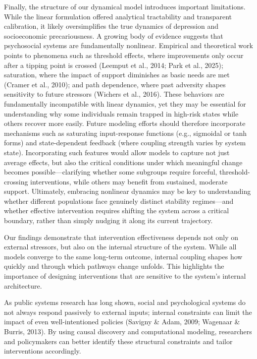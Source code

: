 \documentclass[
]{article}
\begin{document}
Finally, the structure of our dynamical model introduces important
limitations. While the linear formulation offered analytical
tractability and transparent calibration, it likely oversimplifies the
true dynamics of depression and socioeconomic precariousness. A growing
body of evidence suggests that psychosocial systems are fundamentally
nonlinear. Empirical and theoretical work points to phenomena such as
threshold effects, where improvements only occur after a tipping point
is crossed (Leemput et al., 2014; Park et al., 2025); saturation, where
the impact of support diminishes as basic needs are met (Cramer et al.,
2010); and path dependence, where past adversity shapes sensitivity to
future stressors (Wichers et al., 2016). These behaviors are
fundamentally incompatible with linear dynamics, yet they may be
essential for understanding why some individuals remain trapped in
high-risk states while others recover more easily. Future modeling
efforts should therefore incorporate mechanisms such as saturating
input-response functions (e.g., sigmoidal or tanh forms) and
state-dependent feedback (where coupling strength varies by system
state). Incorporating such features would allow models to capture not
just average effects, but also the critical conditions under which
meaningful change becomes possible---clarifying whether some subgroups
require forceful, threshold-crossing interventions, while others may
benefit from sustained, moderate support. Ultimately, embracing
nonlinear dynamics may be key to understanding whether different
populations face genuinely distinct stability regimes---and whether
effective intervention requires shifting the system across a critical
boundary, rather than simply nudging it along its current trajectory.

Our findings demonstrate that intervention effectiveness depends not
only on external stressors, but also on the internal structure of the
system. While all models converge to the same long-term outcome,
internal coupling shapes how quickly and through which pathways change
unfolds. This highlights the importance of designing interventions that
are sensitive to the system's internal architecture.

As public systems research has long shown, social and psychological
systems do not always respond passively to external inputs; internal
constraints can limit the impact of even well-intentioned policies
(Savigny \& Adam, 2009; Wagenaar \& Burris, 2013). By using causal
discovery and computational modeling, researchers and policymakers can
better identify these structural constraints and tailor interventions
accordingly.
\end{document}
